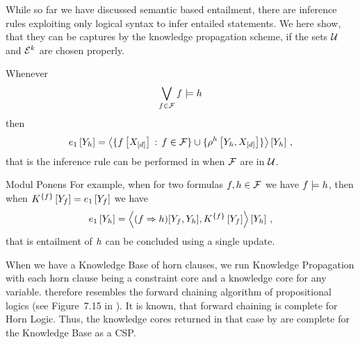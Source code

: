 
While so far we have discussed semantic based entailment, there are inference rules exploiting only logical syntax to infer entailed statements.
We here show, that they can be captures by the knowledge propagation scheme, if the sets $\mathcal{U}$ and $\mathcal{E}^{k}$ are chosen properly.

Whenever
\begin{align*}
    \bigvee_{f\in\mathcal{F}} f \models h
\end{align*}
then
\begin{align*}
    e_1\left[Y_{h}\right] =
    \left\langle \{f\left[X_{[d]}\right] \, : \, f\in\mathcal{F}\} \cup \{\rho^{h}\left[Y_{h},X_{[d]}\right]\}\right\rangle \left[ Y_{h} \right] \, ,
\end{align*}
that is the inference rule can be performed in when $\mathcal{F}$ are in $\mathcal{U}$.

\begin{example}{Modul Ponens}
    For example, when for two formulas $f,h\in\mathcal{F}$ we have $f\models h$, then when $K^{\{f\}}\left[Y_{f}\right] = e_1\left[Y_{f}\right]$ we have
    \begin{align*}
        e_1\left[Y_{h}\right]
        = \left\langle (f\Rightarrow h)[Y_{f},Y_{h}],K^{\{f\}}\left[Y_{f}\right]\right\rangle \left[ Y_{h} \right] \, ,
    \end{align*}
    that is entailment of $h$ can be concluded using a single update.

    When we have a Knowledge Base of horn clauses, we run Knowledge Propagation with each horn clause being a constraint core and a knowledge core for any variable.
     therefore resembles the forward chaining algorithm of propositional logics (see Figure~7.15 in \cite{russell_artificial_2021}).
    It is known, that forward chaining is complete for Horn Logic.
    Thus, the knowledge cores returned in that case by  are complete for the Knowledge Base as a CSP.
\end{example}




